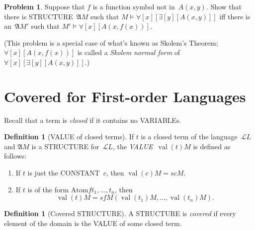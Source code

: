 \documentclass[10pt,a4paper]{article}
\newcommand*{\olup}[1]{\MakeUppercase{#1}}
\theoremstyle{plain}
\theoremstyle{definition}
\newtheorem{defn}[thm]{Definition}
\newtheorem{prob}{Problem}[section]
\theoremstyle{remark}
\newenvironment{explain}{}{}
\newcommand*{\olfileid}[3]{}
\newcommand*{\olsection}[1]{\section*{#1}}
\providecommand{\lforall}{\mathord{\forall}}
\providecommand{\lexists}{\mathord{\exists}}
\providecommand{\Struct}{\ensuremath{\mathfrak{A}}}
\providecommand{\Assign}{\ensuremath{s}}
\providecommand{\Sat}[2]{\ensuremath{#1 \models #2}}
\providecommand{\Lang}{\ensuremath{\mathcal{L}}}
\providecommand{\Value}[1]{\operatorname{val}(#1)}
\providecommand{\Atom}{\mathrm{Atom}}
\begin{document}
\begin{prob}
Suppose that $f$ is a function symbol not in~$A(x,y)$. Show that
there is \olup{structure}~$\Struct{M}$ such that
$\Sat{M}{\lforall[x][\lexists[y][A(x,y)]]}$ iff there is an~$\Struct
M'$ such that $\Sat{M'}{\lforall[x][A(x,f(x))]}$.

(This problem is a special case of what's known as Skolem's Theorem;
$\lforall[x][A(x,f(x))]$ is called a \emph{Skolem normal form} of
$\lforall[x][\lexists[y][A(x,y)]]$.)
\end{prob}





\olfileid{fol}{syn}{cov}

\olsection{Covered  for First-order Languages}

\begin{explain}
Recall that a term is \emph{closed} if it contains no \olup{variable}s.
\end{explain}

\begin{defn}[\olup{value} of closed terms]
If $t$ is a closed term of the language~$\Lang L$ and $\Struct M$ is a
\olup{structure} for~$\Lang L$, the \emph{\olup{value}}~$\Value{t}{M}$ is
defined as follows:
\begin{enumerate}
\item If $t$ is just the \olup{constant}~$c$, then $\Value{c}{M} = \Assign{c}{M}$.
\item If $t$ is of the form $\Atom{f}{t_1, \ldots, t_n}$, then
  \[
  \Value{t}{M} = \Assign{f}{M}(\Value{t_1}{M}, \ldots,
  \Value{t_n}{M}).
  \]
\end{enumerate}
\end{defn}

\begin{defn}[Covered \olup{structure}]
A \olup{structure} is \emph{covered} if every element of the domain is the
\olup{value} of some closed term.
\end{defn}
\end{document}
